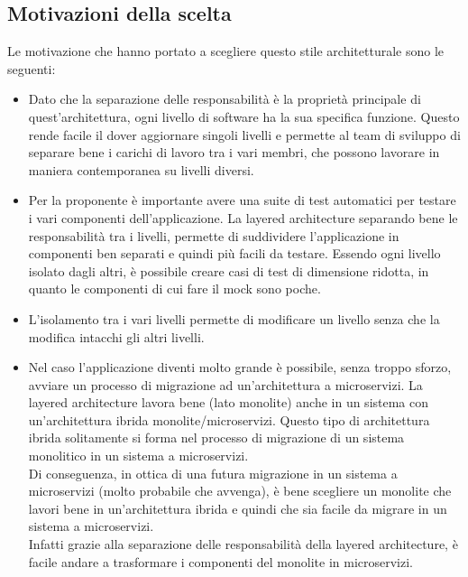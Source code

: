 \subsection{Motivazioni della scelta}
Le motivazione che hanno portato a scegliere questo stile architetturale sono le seguenti:
\begin{itemize}
    \item Dato che la separazione delle responsabilità è la proprietà principale di quest'architettura,
        ogni livello di software ha la sua specifica funzione. Questo rende facile il dover aggiornare 
        singoli livelli e permette al team di sviluppo di separare bene i carichi di lavoro tra i vari 
        membri, che possono lavorare in maniera contemporanea su livelli diversi.
    \item Per la proponente è importante avere una suite di test automatici per testare i vari componenti
        dell'applicazione. La layered architecture separando bene le responsabilità tra i livelli, 
        permette di suddividere l'applicazione in componenti ben separati e quindi più facili da testare.
        Essendo ogni livello isolato dagli altri, è possibile creare casi di test di dimensione ridotta, 
        in quanto le componenti di cui fare il mock sono poche.
    \item L'isolamento tra i vari livelli permette di modificare un livello senza che la modifica intacchi
        gli altri livelli.
    \item Nel caso l'applicazione diventi molto grande è possibile, senza troppo sforzo, avviare un processo
        di migrazione ad un'architettura a microservizi. La layered architecture lavora bene (lato monolite) anche
        in un sistema con un'architettura ibrida monolite/microservizi. Questo tipo di architettura
        ibrida solitamente si forma nel processo di migrazione di un sistema monolitico in un sistema a microservizi.
        \\
        Di conseguenza, in ottica di una futura migrazione in un sistema a microservizi (molto probabile che avvenga), è
        bene scegliere un monolite che lavori bene in un'architettura ibrida e quindi che sia facile da migrare
        in un sistema a microservizi.
        \\
        Infatti grazie alla separazione delle responsabilità della layered architecture, è facile andare
        a trasformare i componenti del monolite in microservizi.
\end{itemize}

